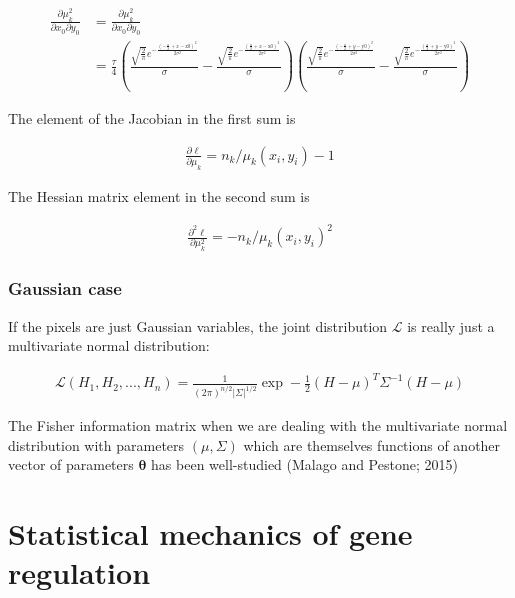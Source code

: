 \documentclass{ucetd}
\begin{document}
\begin{align*}
\frac{\partial \mu_{k}^{2}}{\partial x_{0}\partial y_{0}} &= \frac{\partial \mu_{k}^{2}}{\partial x_{0}\partial y_{0}} \\
&= \frac{\tau}{4}\left(\frac{\sqrt{\frac{2}{\pi }} e^{-\frac{\left(-\frac{a}{2}+x-\text{x0}\right)^2}{2 \sigma ^2}}}{\sigma }-\frac{\sqrt{\frac{2}{\pi }} e^{-\frac{\left(\frac{a}{2}+x-\text{x0}\right)^2}{2 \sigma ^2}}}{\sigma }\right) \left(\frac{\sqrt{\frac{2}{\pi }} e^{-\frac{\left(-\frac{a}{2}+y-\text{y0}\right)^2}{2 \sigma ^2}}}{\sigma }-\frac{\sqrt{\frac{2}{\pi }} e^{-\frac{\left(\frac{a}{2}+y-\text{y0}\right)^2}{2 \sigma ^2}}}{\sigma }\right)
\end{align*}

The element of the Jacobian in the first sum is

\begin{align*}
\frac{\partial\ell}{\partial\mu_{k}} = n_{k}/\mu_{k}(x_{i},y_{i}) - 1
\end{align*}


The Hessian matrix element in the second sum is

\begin{align*}
\frac{\partial^{2}\ell}{\partial\mu_{k}^{2}} = -n_{k}/\mu_{k}(x_{i},y_{i})^{2} 
\end{align*}


\subsection{Gaussian case}
If the pixels are just Gaussian variables, the joint distribution $\mathcal{L}$ is really just a multivariate normal distribution:

\begin{align*}
\mathcal{L}(H_{1},H_{2},...,H_{n}) = \frac{1}{(2\pi)^{n/2}|\Sigma|^{1/2}}\exp-\frac{1}{2}(H-\mu)^{T}\Sigma^{-1}(H-\mu)
\end{align*}

The Fisher information matrix when we are dealing with the multivariate normal distribution with parameters $(\mu,\Sigma)$ which are themselves functions of another vector of parameters $\bm{\theta}$ has been well-studied (Malago and Pestone; 2015)




\chapter{Statistical mechanics of gene regulation}
\end{document}
